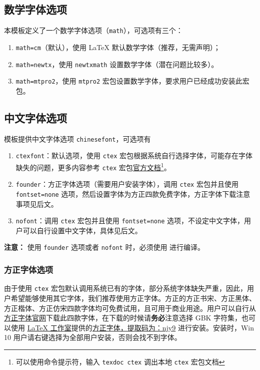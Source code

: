 \documentclass[cn,hazy,blue,14pt,screen]{elegantnote}
\begin{document}
\subsection{数学字体选项}

本模板定义了一个数学字体选项（\lstinline{math}），可选项有三个：
\begin{enumerate}
  \item \lstinline{math=cm}（默认），使用 \LaTeX{} 默认数学字体（推荐，无需声明）；
  \item \lstinline{math=newtx}，使用 \lstinline{newtxmath} 设置数学字体（潜在问题比较多）。
  \item \lstinline{math=mtpro2}，使用 \lstinline{mtpro2} 宏包设置数学字体，要求用户已经成功安装此宏包。
\end{enumerate}


\subsection{中文字体选项}
模板提供中文字体选项 \lstinline{chinesefont}，可选项有
\begin{enumerate}
\item \lstinline{ctexfont}：默认选项，使用 \lstinline{ctex} 宏包根据系统自行选择字体，可能存在字体缺失的问题，更多内容参考 \lstinline{ctex} 宏包\href{https://ctan.org/pkg/ctex}{官方文档}\footnote{可以使用命令提示符，输入 \lstinline{texdoc ctex} 调出本地 \lstinline{ctex} 宏包文档}。
\item \lstinline{founder}：方正字体选项（需要用户安装字体），调用 \lstinline{ctex} 宏包并且使用 \lstinline{fontset=none} 选项，然后设置字体为方正四款免费字体，方正字体下载注意事项见后文。
\item \lstinline{nofont}：调用 \lstinline{ctex} 宏包并且使用 \lstinline{fontset=none} 选项，不设定中文字体，用户可以自行设置中文字体，具体见后文。
\end{enumerate}

\noindent \textbf{注意：} 使用 \lstinline{founder} 选项或者 \lstinline{nofont} 时，必须使用  进行编译。

\subsubsection{方正字体选项}
由于使用 \lstinline{ctex} 宏包默认调用系统已有的字体，部分系统字体缺失严重，因此，用户希望能够使用其它字体，我们推荐使用方正字体。方正的{\songti 方正书宋}、{\heiti 方正黑体}、{\kaishu 方正楷体}、{\fangsong 方正仿宋}四款字体均可免费试用，且可用于商业用途。用户可以自行从\href{http://www.foundertype.com/}{方正字体官网}下载此四款字体，在下载的时候请\textbf{务必}注意选择 GBK 字符集，也可以使用 \href{https://www.latexstudio.net/}{\LaTeX{} 工作室}提供的\href{https://pan.baidu.com/s/1BgbQM7LoinY7m8yeP25Y7Q}{方正字体，提取码为：njy9} 进行安装。安装时，{\kaishu Win 10 用户请右键选择为全部用户安装，否则会找不到字体。}
\end{document}
